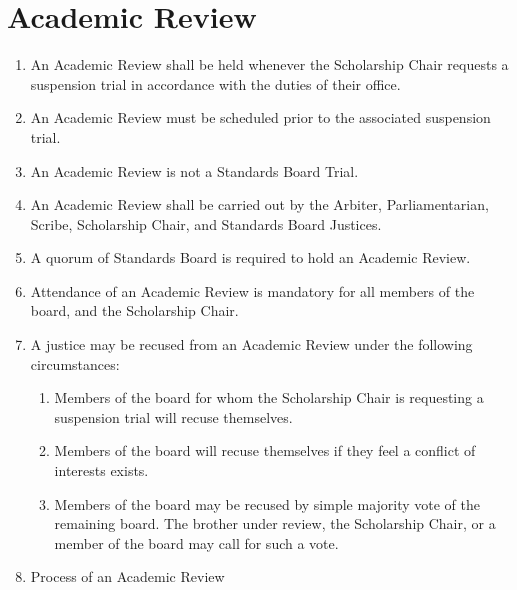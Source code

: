 \section{Academic Review}
	\label{academic-review}
	\begin{enumerate}
		\item An Academic Review shall be held whenever the Scholarship Chair requests a suspension trial in accordance with the duties of their office.
		\item An Academic Review must be scheduled prior to the associated suspension trial.
		\item An Academic Review is not a Standards Board Trial.
		\item An Academic Review shall be carried out by the Arbiter, Parliamentarian, Scribe, Scholarship Chair, and Standards Board Justices.
		\item A quorum of Standards Board is required to hold an Academic Review.
		\item Attendance of an Academic Review is mandatory for all members of the board, and the Scholarship Chair.
		\item A justice may be recused from an Academic Review under the following circumstances:
			\begin{enumerate}
				\item Members of the board for whom the Scholarship Chair is requesting a suspension trial will recuse themselves.
				\item Members of the board will recuse themselves if they feel a conflict of interests exists.
				\item Members of the board may be recused by simple majority vote of the remaining board. The brother under review, the Scholarship Chair, or a member of the board may call for such a vote.
			\end{enumerate}
		\item Process of an Academic Review

\end{enumerate}
